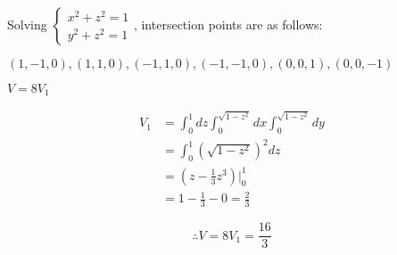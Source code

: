 \documentclass{article}
\begin{document}
  Solving $\left\{ \begin{array}{ll} x^2+z^2=1 \\ y^2+z^2=1 \end{array} \right.$, intersection points are as follows:

  $(1, -1, 0), (1, 1, 0), (-1, 1, 0), (-1, -1, 0), (0, 0, 1), (0, 0, -1)$

  $V = 8V_1$

  $$\begin{aligned}
    V_1 &= \int_0^1 dz \int_0^{\sqrt{1-z^2}}dx \int_0^{\sqrt{1-z^2}} dy \\
    &= \int_0^1 (\sqrt{1-z^2})^2 dz \\
    &= (z - \frac 1 3 z^3)\biggl|_0^1 \\
    &= 1 - \frac 1 3 - 0 = \frac 2 3
  \end{aligned}$$

  $$\therefore V = 8V_1 = \frac{16}{3}$$
  
\end{document}
